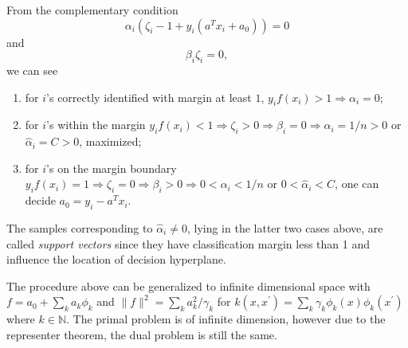 \documentclass[twoside]{article}
\theoremstyle{definition}
\theoremstyle{definition}
\theoremstyle{remark}
\def\N{{\mathbb N}}
\begin{document}
From the complementary condition 
$$ \alpha_i (\zeta_i - 1 + y_i(a^T x_i + a_0))=0 $$ 
and 
$$\beta_i\zeta_i=0, $$ 
we can see
\begin{enumerate} 
\item for $i$'s correctly identified with margin at least $1$, $y_if(x_i) >1 \Rightarrow \alpha_i=0$; 
\item for $i$'s within the margin $y_if(x_i)<1 \Rightarrow \zeta_i>0\Rightarrow \beta_i=0\Rightarrow \alpha_i=1/n>0$ or $\hat{\alpha}_i=C>0$, maximized; 
\item for $i$'s on the margin boundary $y_if(x_i)=1\Rightarrow \zeta_i=0\Rightarrow \beta_i>0\Rightarrow 0<\alpha_i<1/n$ or $0<\hat{\alpha}_i< C$, one can decide $a_0=y_i - a^T x_i$.
\end{enumerate}  
The samples corresponding to $\hat{\alpha}_i\neq 0$, lying in the latter two cases above, are called \emph{support vectors} since they have classification margin less than 1 and influence the location of decision hyperplane.

The procedure above can be generalized to infinite dimensional space with $f=a_0 + \sum_k a_k \phi_k$ and $\|f\|^2 = \sum_k a_k^2 /\gamma_k$ for $k(x,x^\prime)=\sum_k \gamma_k \phi_k(x)\phi_k(x^\prime)$ where $k\in \N$. The primal problem is of infinite dimension, however due to the representer theorem, the dual problem is still the same.
\end{document}
